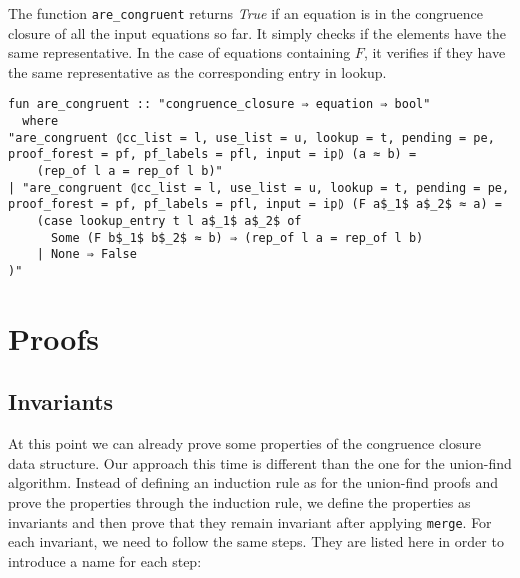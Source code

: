 The function \lstinline{are_congruent} returns \emph{True} if an equation is in the congruence closure of all the input equations so far. It simply checks if the elements have the same representative. In the case of equations containing $F$, it verifies if they have the same representative as the corresponding entry in lookup.

\begin{lstlisting}
fun are_congruent :: "congruence_closure ⇒ equation ⇒ bool"
  where
"are_congruent ⦇cc_list = l, use_list = u, lookup = t, pending = pe, proof_forest = pf, pf_labels = pfl, input = ip⦈ (a ≈ b) =
    (rep_of l a = rep_of l b)"
| "are_congruent ⦇cc_list = l, use_list = u, lookup = t, pending = pe, proof_forest = pf, pf_labels = pfl, input = ip⦈ (F a$_1$ a$_2$ ≈ a) =
    (case lookup_entry t l a$_1$ a$_2$ of
      Some (F b$_1$ b$_2$ ≈ b) ⇒ (rep_of l a = rep_of l b)
    | None ⇒ False
)"
\end{lstlisting}

\section{Proofs}

\subsection{Invariants}

At this point we can already prove some properties of the congruence closure data structure. Our approach this time is different than the one for the union-find algorithm. Instead of defining an induction rule as for the union-find proofs and prove the properties through the induction rule, we define the properties as invariants and then prove that they remain invariant after applying \lstinline|merge|. For each invariant, we need to follow the same steps. They are listed here in order to introduce a name for each step:


